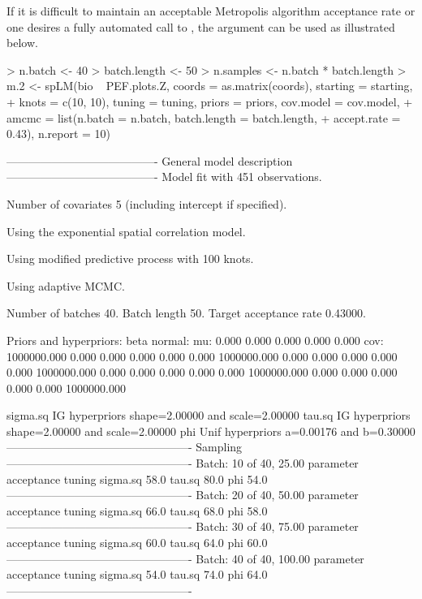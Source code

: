 \documentclass{article}
\begin{document}
If it is difficult to maintain an acceptable Metropolis algorithm acceptance rate or one desires a fully automated call to \verb@spLM@, the \verb@amcmc@ argument can be used as illustrated below. 
\begin{Schunk}
\begin{Sinput}
> n.batch <- 40
> batch.length <- 50
> n.samples <- n.batch * batch.length
> m.2 <- spLM(bio ~ PEF.plots.Z, coords = as.matrix(coords), starting = starting, 
+     knots = c(10, 10), tuning = tuning, priors = priors, cov.model = cov.model, 
+     amcmc = list(n.batch = n.batch, batch.length = batch.length, 
+         accept.rate = 0.43), n.report = 10)
\end{Sinput}
\begin{Soutput}
----------------------------------------
	General model description
----------------------------------------
Model fit with 451 observations.

Number of covariates 5 (including intercept if specified).

Using the exponential spatial correlation model.

Using modified predictive process with 100 knots.

Using adaptive MCMC.

	Number of batches 40.
	Batch length 50.
	Target acceptance rate 0.43000.

Priors and hyperpriors:
	beta normal:
	mu:	0.000	0.000	0.000	0.000	0.000	
	cov:
	1000000.000	0.000	0.000	0.000	0.000	
	0.000	1000000.000	0.000	0.000	0.000	
	0.000	0.000	1000000.000	0.000	0.000	
	0.000	0.000	0.000	1000000.000	0.000	
	0.000	0.000	0.000	0.000	1000000.000	

	sigma.sq IG hyperpriors shape=2.00000 and scale=2.00000
	tau.sq IG hyperpriors shape=2.00000 and scale=2.00000
	phi Unif hyperpriors a=0.00176 and b=0.30000
-------------------------------------------------
		Sampling
-------------------------------------------------
Batch: 10 of 40, 25.00%
	parameter	acceptance	tuning
	sigma.sq	58.0%
	tau.sq		80.0%
	phi		54.0%
-------------------------------------------------
Batch: 20 of 40, 50.00%
	parameter	acceptance	tuning
	sigma.sq	66.0%
	tau.sq		68.0%
	phi		58.0%
-------------------------------------------------
Batch: 30 of 40, 75.00%
	parameter	acceptance	tuning
	sigma.sq	60.0%
	tau.sq		64.0%
	phi		60.0%
-------------------------------------------------
Batch: 40 of 40, 100.00%
	parameter	acceptance	tuning
	sigma.sq	54.0%
	tau.sq		74.0%
	phi		64.0%
-------------------------------------------------
\end{Soutput}
\end{Schunk}
\end{document}

